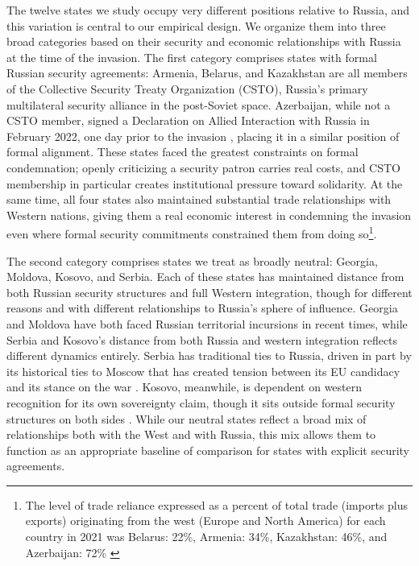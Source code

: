 \documentclass[12pt]{article}
\begin{document}
The twelve states we study occupy very different positions relative to Russia, and this variation is central to our empirical design. We organize them into three broad categories based on their security and economic relationships with Russia at the time of the invasion. The first category comprises states with formal Russian security agreements: Armenia, Belarus, and Kazakhstan are all members of the Collective Security Treaty Organization (CSTO), Russia's primary multilateral security alliance in the post-Soviet space. Azerbaijan, while not a CSTO member, signed a Declaration on Allied Interaction with Russia in February 2022, one day prior to the invasion \citep{huseynov_azerbaijan_2022}, placing it in a similar position of formal alignment. These states faced the greatest constraints on formal condemnation; openly criticizing a security patron carries real costs, and CSTO membership in particular creates institutional pressure toward solidarity. At the same time, all four states also maintained substantial trade relationships with Western nations, giving them a real economic interest in condemning the invasion even where formal security commitments constrained them from doing so\footnote{The level of trade reliance expressed as a percent of total trade (imports plus exports) originating from the west (Europe and North America) for each country in 2021 was Belarus: 22\%, Armenia: 34\%, Kazakhstan: 46\%, and Azerbaijan: 72\% \citep{world_bank_world_2021}}.

The second category comprises states we treat as broadly neutral: Georgia, Moldova, Kosovo, and Serbia. Each of these states has maintained distance from both Russian security structures and full Western integration, though for different reasons and with different relationships to Russia's sphere of influence. Georgia and Moldova have both faced Russian territorial incursions in recent times\citep{cheterian_august_2009, potter_unrecognized_2022}, while Serbia and Kosovo's distance from both Russia and western integration reflects different dynamics entirely. Serbia has traditional ties to Russia, driven in part by its historical ties to Moscow that has created tension between its EU candidacy and its stance on the war \citep{radeljic_inefficiency_2023}. Kosovo, meanwhile, is dependent on western recognition for its own sovereignty claim, though it sits outside formal security structures on both sides \citep{newman_foreign_2016}. While our neutral states reflect a broad mix of relationships both with the West and with Russia, this mix allows them to function as an appropriate baseline of comparison for states with explicit security agreements.
\end{document}
